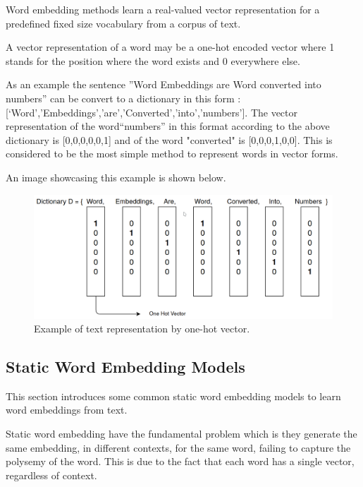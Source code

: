     \par  Word embedding methods learn a real-valued vector representation for a predefined fixed size vocabulary from a corpus  of text. \cite{Brownlee2017}  
   
    \par A vector representation of a word may be a one-hot encoded vector where 1 stands for the position where the word exists and 0 everywhere else. 
    
    \par As an example the sentence   ”Word Embeddings are Word converted into numbers” can be convert to a dictionary in this form : [‘Word’,’Embeddings’,’are’,’Converted’,’into’,’numbers’]. The vector representation of the word“numbers” in this format according to the above dictionary is [0,0,0,0,0,1] and of the word "converted" is [0,0,0,1,0,0]. This is considered to be the most simple method to represent words in vector forms. \cite{Vidhya2017}
    \par An image showcasing this example is shown below.
    
    
    \begin{figure}[htb]
        \centering
        \includegraphics[scale = 0.23]{Sections/3StateOfTheArt/3_images/one_hot_encoding.png}
        \caption{Example of text representation by one-hot vector.}   
    \end{figure}
    
    
    

 

    \newpage

    \subsection{Static Word Embedding Models}
    \label{sec:static}
    \par This section introduces some common static word embedding models to learn word embeddings from text.


    \par Static word embedding have the fundamental problem which is they generate the same embedding, in different contexts, for the same word, failing to capture the polysemy of the word. This is due to the fact that each word has a single vector, regardless of context. \cite{Mikolov2013}  
   

